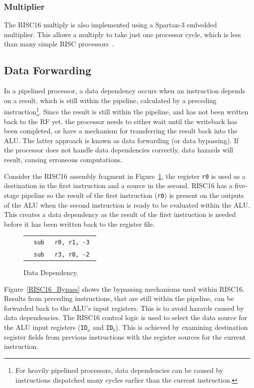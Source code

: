 \subsubsection{Multiplier}
The RISC16 multiply is also implemented using a Spartan-3 embedded multiplier.
This allows a multiply to take just one processor cycle, which is less than
many simple RISC processors~\cite{xilinx2008mpr, britton2004mal}.


\subsection{Data Forwarding}
In a pipelined processor, a data dependency occurs when an instruction depends on
a result, which is still within the pipeline, calculated by a preceding
instruction\footnote{For heavily pipelined processors, data dependencies can be
caused by instructions dispatched many cycles earlier than the current
instruction.}. Since the result is still within the pipeline, and has not been
written back to the RF yet, the processor needs to either wait until the
writeback has been completed, or have a mechanism for transferring the result
back into the ALU. The latter approach is known as data forwarding (or data
bypassing). If the processor does not handle data dependencies correctly, data
hazards will result, causing erroneous computations.

Consider the RISC16 assembly fragment in Figure~\ref{Data_Hazard_ASM}, the
register \texttt{r0} is used as a destination in the first instruction and a
source in the second. RISC16 has a five-stage pipeline so the result of the first
instruction (\texttt{r0}) is present on the outputs of the ALU when the second
instruction is ready to be evaluated within the ALU. This creates a data
dependency as the result of the first instruction is needed before it has been
written back to the register file.

\begin{figure}[h]
\begin{center}
\begin{tabular}{ c  c  c }
		& \tt sub	& \tt r0, r1, -3 \\
		& \tt sub	& \tt r3, r0, -2 \\
\end{tabular}
\caption{Data Dependency.}
\label{Data_Hazard_ASM}
\end{center}
\end{figure}

Figure~\ref{RISC16_Bypass} shows the bypassing mechanisms used within RISC16.
Results from preceding instructions, that are still within the pipeline, can be
forwarded back to the ALU's input registers. This is to avoid hazards caused by
data dependencies. The RISC16 control logic is used to select the data source for
the ALU input registers (\texttt{ID$_a$} and \texttt{ID$_b$}). This is achieved
by examining destination register fields from previous instructions with the
register sources for the current instruction.

